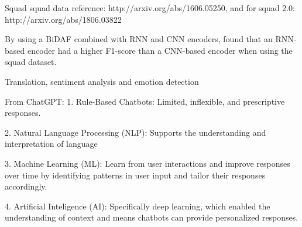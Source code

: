 Squad \acrshort{squad} data reference: http://arxiv.org/abs/1606.05250, and for squad 2.0: http://arxiv.org/abs/1806.03822

By using a BiDAF combined with RNN and CNN encoders, \citep{Budiharto} found that an RNN-based encoder had a higher F1-score than a CNN-based encoder when using the \acrshort{squad} dataset.

Translation, sentiment analysis and emotion detection \citep{Hirschberg}



From ChatGPT:
1. Rule-Based Chatbots: Limited, inflexible, and prescriptive responses.

2. Natural Language Processing (NLP): Supports the understanding and interpretation of language

3. Machine Learning (ML): Learn from user interactions and improve responses over time by identifying patterns in user input and tailor their responses accordingly.

4. Artificial Inteligence (AI): Specifically deep learning, which enabled the understanding of context and means chatbots can provide personalized responses.
